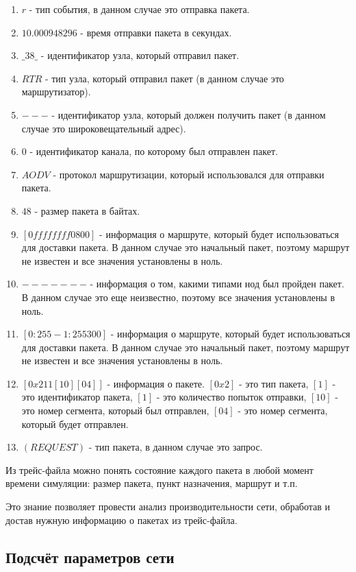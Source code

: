 \begin{enumerate}
  \item $r$ - тип события, в данном случае это отправка пакета.
  \item $10.000948296$ - время отправки пакета в секундах.
  \item $\_38\_$ - идентификатор узла, который отправил пакет.
  \item $RTR$ - тип узла, который отправил пакет (в данном случае это маршрутизатор).
  \item $---$ - идентификатор узла, который должен получить пакет (в данном случае это широковещательный адрес).
  \item $0$ - идентификатор канала, по которому был отправлен пакет.
  \item $AODV$ - протокол маршрутизации, который использовался для отправки пакета.
  \item $48$ - размер пакета в байтах.
  \item $[0 ffffffff 0 800]$ - информация о маршруте, который будет использоваться для доставки пакета. В данном случае это начальный пакет, поэтому маршрут не известен и все значения установлены в ноль. 
  \item $-------$ - информация о том, какими типами нод был пройден пакет. В данном случае это еще неизвестно, поэтому все значения установлены в ноль.
  \item $[0:255 -1:255 30 0]$ - информация о маршруте, который будет использоваться для доставки пакета. В данном случае это начальный пакет, поэтому маршрут не известен и все значения установлены в ноль.
  \item $[0x2 1 1 [1 0] [0 4]]$ - информация о пакете. $[0x2]$ - это тип пакета, $[1]$ - это идентификатор пакета, $[1]$ - это количество попыток отправки, $[1 0]$ - это номер сегмента, который был отправлен, $[0 4]$ - это номер сегмента, который будет отправлен.
  \item $(REQUEST)$ - тип пакета, в данном случае это запрос.
\end{enumerate}

Из трейс-файла можно понять состояние каждого пакета в любой момент времени симуляции: размер пакета, пункт назначения, маршрут и т.п.

Это знание позволяет провести анализ производительности сети, обработав и достав нужную информацию о пакетах из трейс-файла.

\subsection*{Подсчёт параметров сети}

